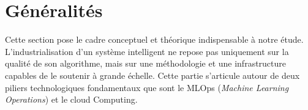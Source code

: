 




\section{Généralités}

Cette section pose le cadre conceptuel et théorique indispensable à notre étude. L'industrialisation d'un système intelligent ne repose pas uniquement sur la qualité de son algorithme, mais sur une méthodologie et une infrastructure capables de le soutenir à grande échelle. Cette partie s'articule autour de deux piliers technologiques fondamentaux que sont le MLOps (\textit{Machine Learning Operations}) et le cloud Computing.

